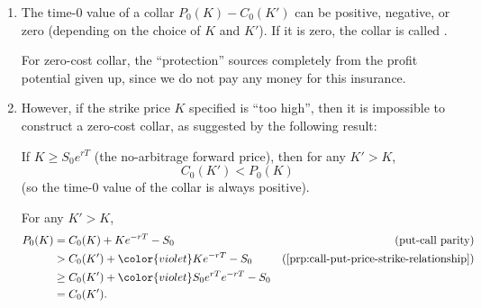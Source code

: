 \begin{enumerate}
\item The time-0 value of a collar \(P_0(K)-C_0(K')\) can be positive,
negative, or zero (depending on the choice of \(K\) and \(K'\)). If it is zero,
the collar is called .

\begin{intuition}
For zero-cost collar, the ``protection'' sources completely from the profit
potential given up, since we do not pay any money for this insurance.
\end{intuition}

\item However, if the strike price \(K\) specified is ``too high'', then it is
impossible to construct a zero-cost collar, as suggested by the following
result:
\begin{proposition}
\label{prp:k-high-no-zero-cost-collar}
If \(K\ge S_0e^{rT}\) (the no-arbitrage forward price), then for any \(K'>K\),
\[
C_0(K')<P_0(K)
\]
(so the time-0 value of the collar is always positive).
\end{proposition}
\begin{pf}
For any \(K'>K\),
\begin{align*}
P_0(K)&=C_0(K)+Ke^{-rT}-S_0&\text{(put-call parity)}\\
&>C_0(K')+{\color{violet}K}e^{-rT}-S_0&\text{(\cref{prp:call-put-price-strike-relationship})}\\
&\ge C_0(K')+{\color{violet}S_0e^{rT}}e^{-rT}-S_0\\
&=C_0(K').
\end{align*}
\end{pf}
\end{enumerate}
